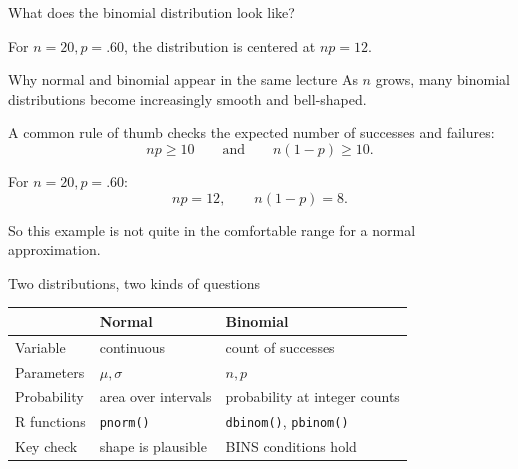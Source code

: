 \documentclass[11pt,aspectratio=169]{beamer}
\begin{document}
\begin{frame}{What does the binomial distribution look like?}
\begin{center}
\end{center}

\vspace{-0.3em}
For $n=20,p=.60$, the distribution is centered at $np=12$.
\end{frame}

\begin{frame}{Why normal and binomial appear in the same lecture}
As $n$ grows, many binomial distributions become increasingly smooth and bell-shaped.

A common rule of thumb checks the expected number of successes and failures:
\[
np\geq10
\qquad\text{and}\qquad
n(1-p)\geq10.
\]

For $n=20,p=.60$:
\[
np=12,\qquad n(1-p)=8.
\]

\vfill
So this example is \alert{not quite} in the comfortable range for a normal approximation.
\end{frame}

\begin{frame}{Two distributions, two kinds of questions}
\begin{center}
\renewcommand{\arraystretch}{1.35}
\begin{tabular}{p{}p{}p{}}
\toprule
 & \textbf{Normal} & \textbf{Binomial} \\
\midrule
Variable & continuous & count of successes \\
Parameters & $\mu,\sigma$ & $n,p$ \\
Probability & area over intervals & probability at integer counts \\
R functions & \texttt{pnorm()} & \texttt{dbinom()}, \texttt{pbinom()} \\
Key check & shape is plausible & BINS conditions hold \\
\bottomrule
\end{tabular}
\end{center}
\end{frame}
\end{document}
